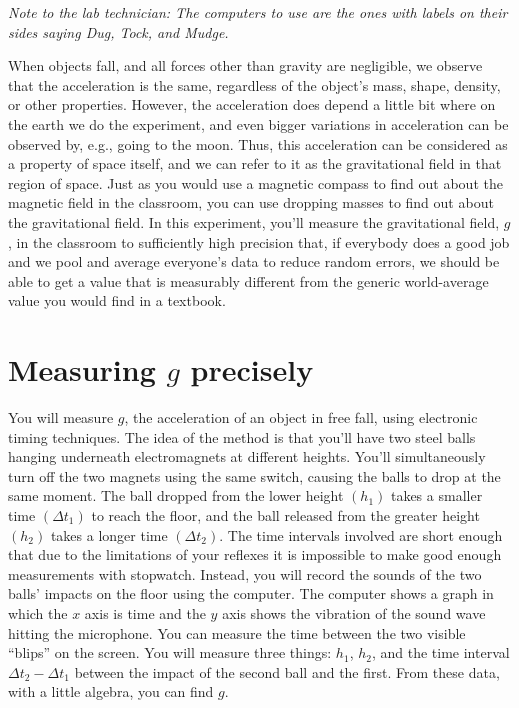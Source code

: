 \label{lab:g}

\emph{Note to the lab technician: The computers to use are the ones
with labels on their sides saying Dug, Tock, and Mudge.}

\apparatus
{}


\introduction
When objects fall, and all forces other than gravity are negligible,
we observe that the acceleration is the same, regardless of the object's
mass, shape, density, or other properties. However, the acceleration does
depend a little bit where on the earth we do the experiment, and even bigger
variations in acceleration can be observed by, e.g., going to the moon.
Thus, this acceleration can be considered as a property of space itself,
and we can refer to it as the gravitational field in that region of space.
Just as you would use a magnetic compass to find out about the magnetic field
in the classroom, you can use dropping masses to find out about the gravitational
field. In this experiment, you'll measure the gravitational field, $g$, in the
classroom to sufficiently high precision that, if everybody does a good job and
we pool and average everyone's data to reduce random errors, we should be able to
get a value that is measurably different from the generic world-average value you
would find in a textbook.

\section*{Measuring $g$ precisely}
You will measure $g$, the
acceleration of an object in free fall, using electronic
timing techniques. The idea of the method is that you'll
have two steel balls hanging underneath electromagnets at
different heights. You'll simultaneously turn off the two
magnets using the same switch, causing the balls to drop at
the same moment. The ball dropped from the lower height
$(h_1)$ takes a smaller time $(\Delta t_1)$ to reach the floor, and
the ball released from the greater height $(h_2)$ takes a
longer time $(\Delta t_2)$. The time intervals involved are short
enough that due to the limitations of your reflexes it is
impossible to make good enough measurements with stopwatch. 
Instead, you will record the sounds of the two balls'
impacts on the floor using the computer.  The computer
shows a graph in which the $x$ axis is time and the $y$ axis
shows the vibration of the sound wave hitting the microphone.
You can measure the time between the two visible ``blips''
on the screen.  You will measure three things: $h_1$, $h_2$,
and the time interval $\Delta t_2-\Delta t_1$ between the impact of the
second ball and the first.  From these data, with a little
algebra, you can find $g$.

